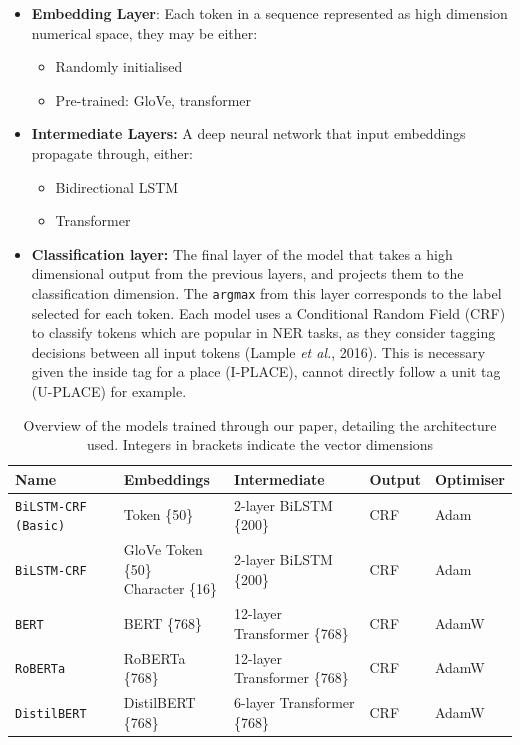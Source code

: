 \documentclass[
  letterpaper,
  11pt,
  english,
  onehalfspacing,
  headsepline]{MastersDoctoralThesis}
\providecommand{\tightlist}{%
  \setlength{\itemsep}{0pt}\setlength{\parskip}{0pt}}\usepackage{longtable,booktabs,array}
\begin{document}
\begin{itemize}
\tightlist
\item
  \textbf{Embedding Layer}: Each token in a sequence represented as high
  dimension numerical space, they may be either:

  \begin{itemize}
  \tightlist
  \item
    Randomly initialised
  \item
    Pre-trained: GloVe, transformer
  \end{itemize}
\item
  \textbf{Intermediate Layers:} A deep neural network that input
  embeddings propagate through, either:

  \begin{itemize}
  \tightlist
  \item
    Bidirectional LSTM
  \item
    Transformer
  \end{itemize}
\item
  \textbf{Classification layer:} The final layer of the model that takes
  a high dimensional output from the previous layers, and projects them
  to the classification dimension. The \texttt{argmax} from this layer
  corresponds to the label selected for each token. Each model uses a
  Conditional Random Field (CRF) to classify tokens which are popular in
  NER tasks, as they consider tagging decisions between all input tokens
  (Lample \emph{et al.}, 2016). This is necessary given the inside tag
  for a place (I-PLACE), cannot directly follow a unit tag (U-PLACE) for
  example.
\end{itemize}

\begin{table}
\caption{\label{tbl-models}Overview of the models trained through our paper, detailing the architecture used. Integers in brackets indicate the vector dimensions}
\centering
\fontsize{9}{11}\selectfont
\begin{tabular}[h]{lllll}
\toprule
\textbf{Name} & \textbf{Embeddings} & \textbf{Intermediate} & \textbf{Output} & \textbf{Optimiser}\\
\midrule
\texttt{BiLSTM-CRF (Basic)} & Token \{50\} & 2-layer BiLSTM \{200\} & CRF & Adam\\
\texttt{BiLSTM-CRF} & \makecell[l]{GloVe Token \{50\}\\ Character \{16\}} & 2-layer BiLSTM \{200\} & CRF & Adam\\
\texttt{BERT} & BERT \{768\} & 12-layer Transformer \{768\} & CRF & AdamW\\
\texttt{RoBERTa} & RoBERTa \{768\} & 12-layer Transformer \{768\} & CRF & AdamW\\
\texttt{DistilBERT} & DistilBERT \{768\} & 6-layer Transformer \{768\} & CRF & AdamW\\
\bottomrule
\end{tabular}
\end{table}
\end{document}
